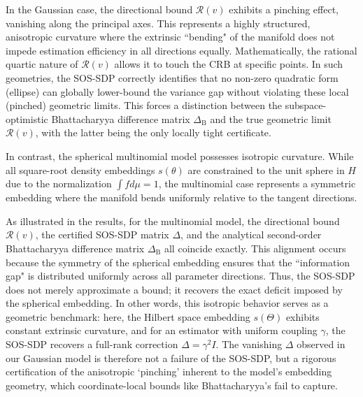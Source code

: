 \documentclass[pdflatex,sn-mathphys-num]{sn-jnl}%
\theoremstyle{thmstyleone}%
\theoremstyle{thmstyletwo}%
\theoremstyle{thmstylethree}%
\begin{document}
In the Gaussian case, the directional bound $\mathcal{R}(v)$ exhibits a pinching effect, vanishing along the principal axes. This represents a highly structured, anisotropic curvature where the extrinsic ``bending" of the manifold does not impede estimation efficiency in all directions equally. Mathematically, the rational quartic nature of $\mathcal{R}(v)$ allows it to touch the CRB at specific points. In such geometries, the SOS-SDP correctly identifies that no non-zero quadratic form (ellipse) can globally lower-bound the variance gap without violating these local (pinched) geometric limits. This forces a distinction between the subspace-optimistic Bhattacharyya difference matrix $\Delta_\mathrm{B}$ and the true geometric limit $\mathcal{R}(v)$, with the latter being the only locally tight certificate.

In contrast, the spherical multinomial model possesses isotropic curvature. While all square-root density embeddings $s(\theta)$ are constrained to the unit sphere in $H$ due to the normalization $\int f d\mu = 1$, the multinomial case represents a symmetric embedding where the manifold bends uniformly relative to the tangent directions.

As illustrated in the results, for the multinomial model, the directional bound $\mathcal{R}(v)$, the certified SOS-SDP matrix $\Delta$, and the analytical second-order Bhattacharyya difference matrix $\Delta_\mathrm{B}$ all coincide exactly. This alignment occurs because the symmetry of the spherical embedding ensures that the ``information gap" is distributed uniformly across all parameter directions. Thus, the SOS-SDP does not merely approximate a bound; it recovers the exact deficit imposed by the spherical embedding.
In other words, this isotropic behavior serves as a geometric benchmark: here, the Hilbert space embedding $s(\Theta)$ exhibits constant extrinsic curvature, and for an estimator with uniform coupling $\gamma$, the SOS-SDP recovers a full-rank correction $\Delta = \gamma^2 I$. The vanishing $\Delta$ observed in our Gaussian model is therefore not a failure of the SOS-SDP, but a rigorous certification of the anisotropic `pinching' inherent to the model's embedding geometry, which coordinate-local bounds like Bhattacharyya's fail to capture. 
\end{document}
